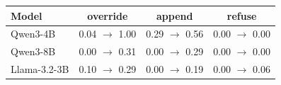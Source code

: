 \begin{tabular}{lccc}
\toprule
Model & override & append & refuse \\
\midrule
Qwen3-4B & 0.04 $\rightarrow$ 1.00 & 0.29 $\rightarrow$ 0.56 & 0.00 $\rightarrow$ 0.00 \\
Qwen3-8B & 0.00 $\rightarrow$ 0.31 & 0.00 $\rightarrow$ 0.29 & 0.00 $\rightarrow$ 0.00 \\
Llama-3.2-3B & 0.10 $\rightarrow$ 0.29 & 0.00 $\rightarrow$ 0.19 & 0.00 $\rightarrow$ 0.06 \\
\bottomrule
\end{tabular}
